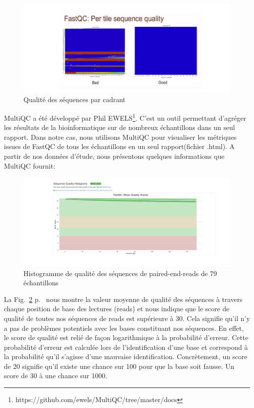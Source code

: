 \documentclass[a4paper,11pt]{article}
\begin{document}
\begin{figure}
  \begin{center}
    \includegraphics[width=16cm]{Images/Fastqc_Plots7}
  \end{center}
  \caption{Qualité des séquences par cadrant}
  \label{fig-Fastqc_Plots7}
\end{figure}


\newpage

MultiQC a été développé par Phil
EWELS\footnote{{https://github.com/ewels/MultiQC/tree/master/docs}}. C'est
un outil permettant d’agréger les résultats de la bioinformatique sur
de nombreux échantillons dans un seul rapport. Dans notre cas, nous
utilisons MultiQC pour visualiser les métriques issues de FastQC de
tous les échantillons en un seul rapport(fichier .html).  A partir de
nos données d'étude, nous présentons quelques informations que MultiQC
fournit:

\begin{figure}
  \begin{center}
    \includegraphics[width=16cm]{Images/MultiQC_Plots1}
  \end{center}
  \caption{Histogramme de qualité des séquences de
    \og{}paired-end-reads\fg{} de 79 échantillons}
  \label{fig-MultiQC_Plots1}
\end{figure}

La Fig.~\ref{fig-MultiQC_Plots1} p.~\pageref{fig-MultiQC_Plots1} nous
montre la valeur moyenne de qualité des séquences à travers chaque
position de base des lectures (reads) et nous indique que le score de
qualité de toutes nos séquences de reads est supérieure à 30. Cela
signifie qu'il n'y a pas de problèmes potentiels avec les bases
constituant nos séquences. En effet, le score de qualité est relié de
façon logarithmique à la probabilité d'erreur. Cette probabilité
d'erreur est calculée lors de l'identification d'une base et
correspond à la probabilité qu'il s'agisse d'une mauvaise
identification. Concrètement, un score de 20 signifie qu'il existe une
chance sur 100 pour que la base soit fausse. Un score de 30 à une
chance sur 1000.
\end{document}
